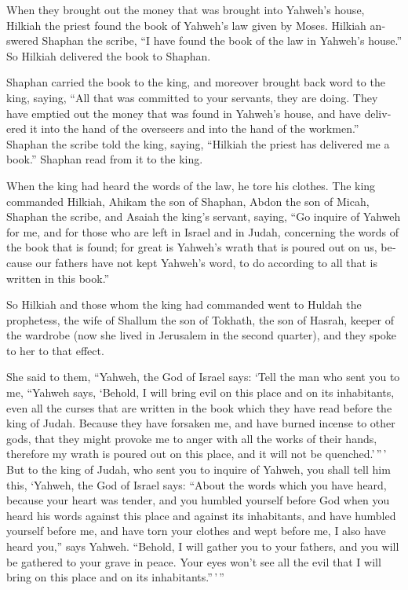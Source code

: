 \begin{paracol}{2}
\begin{otherlanguage}{english}
 When they brought out the money that was brought into
Yahweh's house, Hilkiah the priest found the book of Yahweh's law given
by Moses.  Hilkiah answered Shaphan the scribe, ``I have
found the book of the law in Yahweh's house.'' So Hilkiah delivered the
book to Shaphan.

 Shaphan carried the book to the king, and moreover
brought back word to the king, saying, ``All that was committed to your
servants, they are doing.  They have emptied out the
money that was found in Yahweh's house, and have delivered it into the
hand of the overseers and into the hand of the workmen.''
 Shaphan the scribe told the king, saying, ``Hilkiah the
priest has delivered me a book.'' Shaphan read from it to the king.

 When the king had heard the words of the law, he tore
his clothes.  The king commanded Hilkiah, Ahikam the son
of Shaphan, Abdon the son of Micah, Shaphan the scribe, and Asaiah the
king's servant, saying,  ``Go inquire of Yahweh for me,
and for those who are left in Israel and in Judah, concerning the words
of the book that is found; for great is Yahweh's wrath that is poured
out on us, because our fathers have not kept Yahweh's word, to do
according to all that is written in this book.''

 So Hilkiah and those whom the king had commanded went to
Huldah the prophetess, the wife of Shallum the son of Tokhath, the son
of Hasrah, keeper of the wardrobe (now she lived in Jerusalem in the
second quarter), and they spoke to her to that effect.

 She said to them, ``Yahweh, the God of Israel says:
`Tell the man who sent you to me,  ``Yahweh says,
`Behold, I will bring evil on this place and on its inhabitants, even
all the curses that are written in the book which they have read before
the king of Judah.  Because they have forsaken me, and
have burned incense to other gods, that they might provoke me to anger
with all the works of their hands, therefore my wrath is poured out on
this place, and it will not be quenched.'\,''\,'  But to
the king of Judah, who sent you to inquire of Yahweh, you shall tell him
this, `Yahweh, the God of Israel says: ``About the words which you have
heard,  because your heart was tender, and you humbled
yourself before God when you heard his words against this place and
against its inhabitants, and have humbled yourself before me, and have
torn your clothes and wept before me, I also have heard you,'' says
Yahweh.  ``Behold, I will gather you to your fathers, and
you will be gathered to your grave in peace. Your eyes won't see all the
evil that I will bring on this place and on its inhabitants.''\,'\,''


\end{otherlanguage}
\end{paracol}
